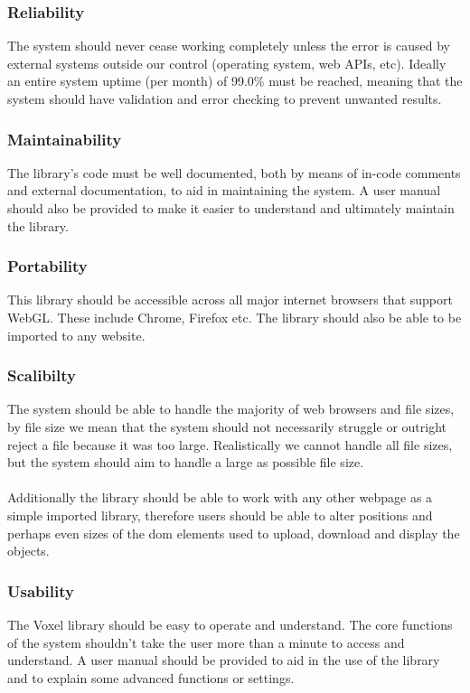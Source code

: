 \documentclass[english]{article}
\begin{document}
		\subsubsection{Reliability}
		The system should never cease working completely unless the error is caused by external systems outside our control (operating system, web APIs, etc). Ideally an entire system uptime (per month) of 99.0\% must be reached, meaning that the system should have validation and error checking to prevent unwanted results.
		
		\subsubsection{Maintainability}
		The library's code must be well documented, both by means of in-code comments and external documentation, to aid in 
		maintaining the system. A user manual should also be provided to make it easier to understand and ultimately maintain the library.
		
		\subsubsection{Portability}
		This library should be accessible across all major internet browsers that support WebGL. These include Chrome, Firefox etc.
		The library should also be able to be imported to any website.
		
		\subsubsection{Scalibilty}
		The system should be able to handle the majority of web browsers and file sizes, by file size we mean that the system should not necessarily struggle or outright reject a file because it was too large. Realistically we cannot handle all file sizes, but the system should aim to handle a large as possible file size. 
		\\\\
		Additionally the library should be able to work with any other webpage as a simple imported library, therefore users should be able to alter positions and perhaps even sizes of the dom elements used to upload, download and display the objects.
		
		\subsubsection{Usability}
		The Voxel library should be easy to operate and understand. The core functions of the system shouldn't take the user more 
		than a minute to access and understand. A user manual should be provided to aid in the use of the library and to explain some advanced functions or settings.
		
\end{document}

